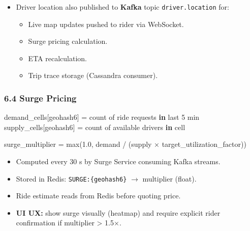 \documentclass[11pt]{article}
\providecommand{\tightlist}{\setlength{\itemsep}{1pt}\setlength{\parskip}{0pt}}
\newenvironment{Shaded}{\begin{snugshade}}{\end{snugshade}}
\newcommand{\BuiltInTok}[1]{\textcolor[rgb]{0.50,0.55,0.55}{#1}}
\newcommand{\DecValTok}[1]{\textcolor[rgb]{0.96,0.45,0.00}{#1}}
\newcommand{\FloatTok}[1]{\textcolor[rgb]{0.96,0.45,0.00}{#1}}
\newcommand{\KeywordTok}[1]{\textcolor[rgb]{0.81,0.81,0.76}{\textbf{#1}}}
\newcommand{\NormalTok}[1]{\textcolor[rgb]{0.81,0.81,0.76}{#1}}
\newcommand{\OperatorTok}[1]{\textcolor[rgb]{0.81,0.81,0.76}{#1}}
\begin{document}

\begin{itemize}
\tightlist
\item
  Driver location also published to \textbf{Kafka} topic \texttt{driver.location} for:

  \begin{itemize}
  \tightlist
  \item
    Live map updates pushed to rider via WebSocket.
  \item
    Surge pricing calculation.
  \item
    ETA recalculation.
  \item
    Trip trace storage (Cassandra consumer).
  \end{itemize}
\end{itemize}

\subsubsection{6.4 Surge Pricing}\label{64-surge-pricing}


\begin{Shaded}
\begin{Highlighting}[]
\NormalTok{demand\_cells[geohash6] }\OperatorTok{=}\NormalTok{ count of ride requests }\KeywordTok{in}\NormalTok{ last }\DecValTok{5} \BuiltInTok{min}
\NormalTok{supply\_cells[geohash6] }\OperatorTok{=}\NormalTok{ count of available drivers }\KeywordTok{in}\NormalTok{ cell}

\NormalTok{surge\_multiplier }\OperatorTok{=} \BuiltInTok{max}\NormalTok{(}\FloatTok{1.0}\NormalTok{, demand }\OperatorTok{/}\NormalTok{ (supply × target\_utilization\_factor))}
\end{Highlighting}
\end{Shaded}

\begin{itemize}
\tightlist
\item
  Computed every 30 s by Surge Service consuming Kafka streams.
\item
  Stored in Redis: \texttt{SURGE:\{geohash6\}} \(\rightarrow\) multiplier (float).
\item
  Ride estimate reads from Redis before quoting price.
\item
  \textbf{UI UX:} show surge visually (heatmap) and require explicit rider confirmation if multiplier \textgreater{} 1.5\(\times\).
\end{itemize}
\end{document}
